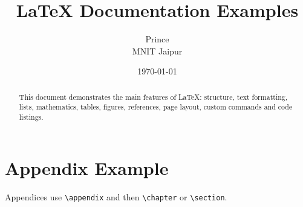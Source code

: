 \documentclass[12pt,a4paper]{report}
\title{\LaTeX{} Documentation Examples}
\author{Prince\\MNIT Jaipur}
\date{\today}
\begin{document}
\maketitle
\begin{abstract}
This document demonstrates the main features of \LaTeX{}: structure,
text formatting, lists, mathematics, tables, figures, references,
page layout, custom commands and code listings.
\end{abstract}
\tableofcontents









\appendix
\chapter{Appendix Example}
Appendices use \verb|\appendix| and then \verb|\chapter| or \verb|\section|.
\end{document}
